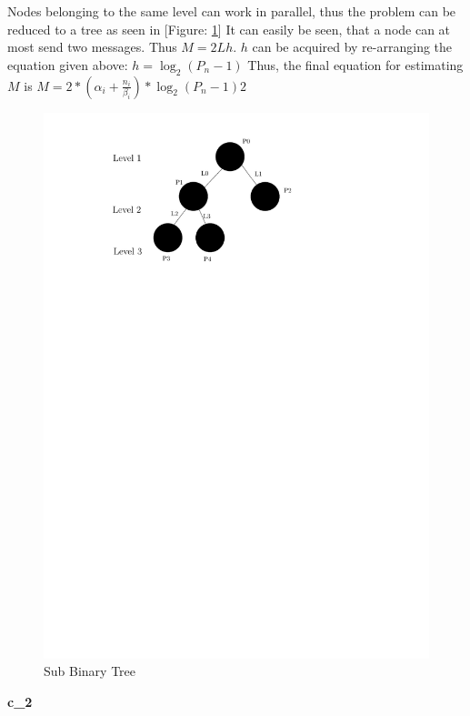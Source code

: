 \documentclass[a4paper,twoside,11pt]{article}
\begin{document}
Nodes belonging to the same level can work in parallel, thus the problem can be reduced to a tree as seen in [Figure: \ref{SubBinTree}]
It can easily be seen, that a node can at most send two messages. Thus $M = 2Lh$.
$h$ can be acquired by re-arranging the equation given above: $h=\log_2 (P_n-1)$
Thus, the final equation for estimating $M$ is $M= 2*(\alpha_i + \frac{n_i}{\beta_i}) * \log_2 (P_n-1)2$


\begin{figure}[!htbp]
    \begin{center}
        \includegraphics[scale=1]{3c_2.pdf}
    \end{center}
    \caption{Sub Binary Tree}
    \label{SubBinTree}
\end{figure}

\textbf{c\_2}
\end{document}
